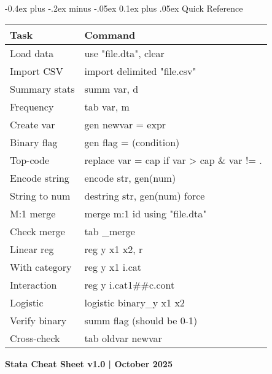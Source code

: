 \documentclass[8pt,landscape,a4paper]{article}
\makeatletter
\renewcommand{\subsection}{\@startsection{subsection}{2}{0mm}%
                                {-0.4ex plus -.2ex minus -.05ex}%
                                {0.1ex plus .05ex}%
                                {\normalfont\fontsize{7.5pt}{7.5pt}\selectfont\bfseries\color{myblue}}}
\makeatother
\begin{document}
\begin{multicols}{3}
\subsection{Quick Reference}

\fontsize{6pt}{6.5pt}\selectfont
\begin{tabular}{@{}ll@{}}
\hline\textbf{Task} & \textbf{Command} \\
\hline
Load data & use "file.dta", clear \\
Import CSV & import delimited "file.csv" \\
Summary stats & summ var, d \\
Frequency & tab var, m \\
Create var & gen newvar = expr \\
Binary flag & gen flag = (condition) \\
Top-code & replace var = cap if var > cap \& var != . \\
Encode string & encode str, gen(num) \\
String to num & destring str, gen(num) force \\
M:1 merge & merge m:1 id using "file.dta" \\
Check merge & tab \_merge \\
Linear reg & reg y x1 x2, r \\
With category & reg y x1 i.cat \\
Interaction & reg y i.cat1\#\#c.cont \\
Logistic & logistic binary\_y x1 x2 \\
Verify binary & summ flag (should be 0-1) \\
Cross-check & tab oldvar newvar \\
\hline
\end{tabular}
\normalsize

\vspace{0.1cm}
{\fontsize{5pt}{6pt}\selectfont \textbf{Stata Cheat Sheet v1.0 | October 2025}}

\end{multicols}
\end{document}
